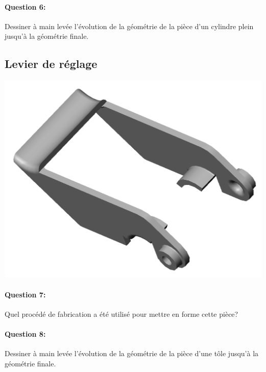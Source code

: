 \paragraph{Question 6:} Dessiner à main levée l'évolution de la géométrie de la pièce d'un cylindre plein jusqu'à la géométrie finale.

\vspace{5cm}

\subsection{Levier de réglage}


 \begin{minipage}{0.3\linewidth}
 \centering\includegraphics[width=1\linewidth]{img/levier_reglage.png}
 \end{minipage}
 \hfill
 \begin{minipage}{0.65\linewidth}
 \paragraph{Question 7:} Quel procédé de fabrication a été utilisé pour mettre en forme cette pièce?

 \end{minipage}


\paragraph{Question 8:} Dessiner à main levée l'évolution de la géométrie de la pièce d'une tôle jusqu'à la géométrie finale.

